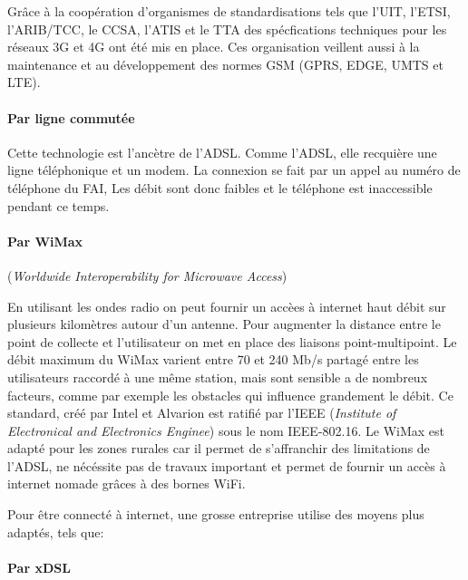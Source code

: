 \documentclass[10pt,a4paper]{article}
\begin{document}
 \smallskip

 Grâce à la coopération d'organismes de standardisations tels que l'UIT, l'ETSI, l'ARIB/TCC, le CCSA, l'ATIS et le TTA des spécfications techniques pour les réseaux 3G et 4G ont été mis en place. Ces organisation veillent aussi à la maintenance et au développement des normes GSM (GPRS, EDGE, UMTS et LTE).

 \paragraph{Par ligne commutée}\leavevmode

 \smallskip

 Cette technologie est l'ancètre de l'ADSL\@. Comme l'ADSL, elle recquière une ligne téléphonique et un modem. La connexion se fait par un appel au numéro de téléphone du FAI, Les débit sont donc faibles et le téléphone est inaccessible pendant ce temps.


 \paragraph{Par WiMax} (\textit{Worldwide Interoperability for Microwave Access})\leavevmode

 \smallskip

 En utilisant les ondes radio on peut fournir un accèes à internet haut débit sur plusieurs kilomètres autour d'un antenne. Pour augmenter la distance entre le point de collecte et l'utilisateur on met en place des liaisons point-multipoint. Le débit maximum du WiMax varient entre 70 et 240 Mb/s partagé entre les utilisateurs raccordé à une même station, mais sont sensible a de nombreux facteurs, comme par exemple les obstacles qui influence grandement le débit.
 Ce standard, créé par Intel et Alvarion est ratifié par l'IEEE (\textit{Institute of Electronical and Electronics Enginee}) sous le nom IEEE-802.16. Le WiMax est adapté pour les zones rurales car il permet de s'affranchir des limitations de l'ADSL, ne nécéssite pas de travaux important et permet de fournir un accès à internet nomade grâces à des bornes WiFi.\\
 \smallskip

 Pour être connecté à internet, une grosse entreprise utilise des moyens plus adaptés, tels que:


 \paragraph{Par xDSL}\leavevmode
\end{document}
